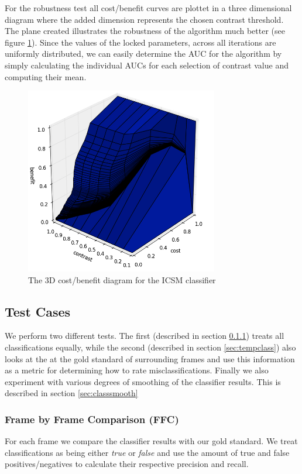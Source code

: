 For the robustness test all cost/benefit curves are plottet in a three dimensional diagram where the added dimension represents the chosen contrast threshold. The plane created illustrates the robustness of the algorithm much better (see figure \ref{fig:3dcostbenefitdiagram}). Since the values of the locked parameters, across all iterations are uniformly distributed, we can easily determine the AUC for the algorithm by simply calculating the individual AUCs for each selection of contrast value and computing their mean.
%
\begin{figure}
     \centering
     \includegraphics[width=0.75\textwidth]{img/3dcostbenefitexample.jpg}
     \caption{The 3D cost/benefit diagram for the ICSM classifier}
     \label{fig:3dcostbenefitdiagram}
\end{figure}
%
\subsection{Test Cases}\label{sec:testcases}
%
We perform two different tests. The first (described in section \ref{sec:fbfclass}) treats all classifications equally, while the second (described in section \ref{sec:tempclass}) also looks at the at the gold standard of surrounding frames and use this information as a metric for determining how to rate misclassifications. Finally we also experiment with various degrees of smoothing of the classifier results. This is described in section \ref{sec:classsmooth}
%
\subsubsection{Frame by Frame Comparison (FFC)}\label{sec:fbfclass}
%
For each frame we compare the classifier results with our gold standard. We treat classifications as being either \textit{true} or \textit{false} and use the amount of true and false positives/negatives to calculate their respective precision and recall.
%
